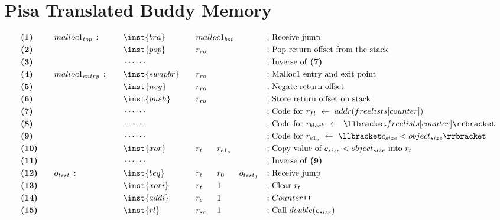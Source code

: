 \chapter{Pisa Translated Buddy Memory}
\label{app:pisa-translated-buddy-memory}
\allowdisplaybreaks
{\tiny
\begin{alignat*}{7}
    &\textbf{(1)}\quad&&malloc1_{top}\ \texttt{:}\quad  &&\inst{bra}\quad &&malloc1_{bot} \span\omit\span\quad \span\omit\span\quad &&\text{; Receive jump}\\ 
    &\textbf{(2)}\quad&& &&\inst{pop}\quad&&r_{ro}&& && &&\text{; Pop return offset from the stack}\\
    &\textbf{(3)}\quad&& &&\cdots\cdots && && && &&\text{; Inverse of \textbf{(7)}}\\
    &\textbf{(4)}\quad&&malloc1_{entry}\ \texttt{:}\quad&&\inst{swapbr}\quad &&r_{ro} && && &&\text{; Malloc1 entry and exit point}\\
    &\textbf{(5)}\quad&& &&\inst{neg}\quad &&r_{ro} && && &&\text{; Negate return offset}\\        
    &\textbf{(6)}\quad&& &&\inst{push}\quad &&r_{ro} && && &&\text{; Store return offset on stack}\\  
    &\textbf{(7)}\quad&& &&\cdots\cdots && && && &&\text{; Code for $r_{fl}\ \leftarrow\ addr(freelists[counter])$}\\
    &\textbf{(8)}\quad&& &&\cdots\cdots && && && &&\text{; Code for $r_{block}\ \leftarrow\ \llbracket freelists[counter] \rrbracket$}\\
    &\textbf{(9)}\quad&& &&\cdots\cdots && && && &&\text{; Code for $r_{e1_o}\ \leftarrow\ \llbracket c_{size} < object_{size} \rrbracket$}\\
    &\textbf{(10)}\quad&& &&\inst{xor}\quad &&r_t && r_{e1_o} && &&\text{; Copy value of $c_{size} < object_{size}$ into $r_t$}\\        
    &\textbf{(11)}\quad&& &&\cdots\cdots && && && &&\text{; Inverse of \textbf{(9)}}\\ 
    &\textbf{(12)}\quad&&o_{test}\ \texttt{:}\quad &&\inst{beq} &&r_t && r_0 && o_{test_f} && \text{; Receive jump}\\
    &\textbf{(13)}\quad&& &&\inst{xori} &&r_t && 1 && && \text{; Clear $r_t$}\\
    &\textbf{(14)}\quad&& &&\inst{addi} &&r_{c} && 1 && && \text{; $Counter\texttt{++}$}\\
    &\textbf{(15)}\quad&& &&\inst{rl} &&r_{sc}\ && 1 && && \text{; Call $double(c_{size}$)}\\

\end{alignat*}}

